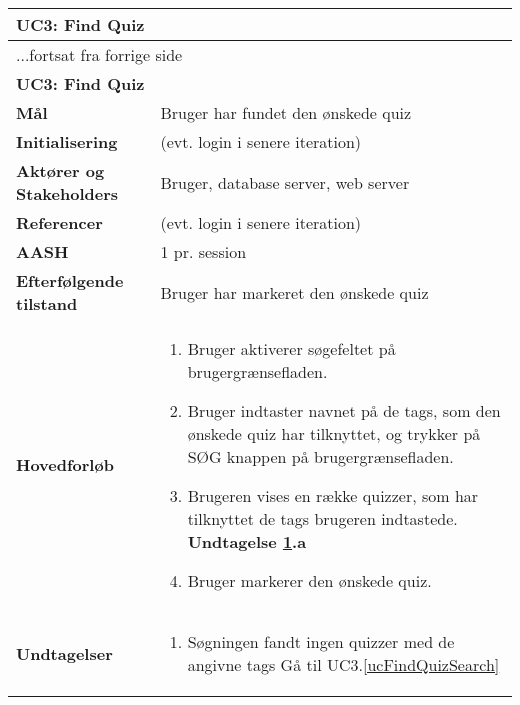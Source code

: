 \begin{center} \centering \label{ucFindQuiz}
	\begin{longtable}{|p{4.6cm}|p{9.4cm}|}  %
	\hline
		\multicolumn{2}{|l|}{\textbf{UC3: Find Quiz}} \\\hline
		\endfirsthead
		
		\multicolumn{2}{l}{...fortsat fra forrige side} \\ \hline %
		\multicolumn{2}{|l|}{\textbf{UC3: Find Quiz}} \\\hline
		\endhead	
		
		\textbf{Mål}					& Bruger har fundet den ønskede quiz
		\\\hline
		\textbf{Initialisering}			& (evt. login i senere iteration)
		\\\hline
		\textbf{Aktører og Stakeholders}	&Bruger, database server, web server
		\\\hline 
		\textbf{Referencer}				& (evt. login i senere iteration)
		\\\hline
		\textbf{AASH}					& 1 pr. session
		\\\hline
		\textbf{Efterfølgende tilstand}	& Bruger har markeret den ønskede quiz
		\\\hline
		\textbf{Hovedforløb}					
			&\begin{enumerate}
				\item Bruger aktiverer søgefeltet på brugergrænsefladen.
				\item \label{ucFindQuizSearch} Bruger indtaster navnet på de tags, %
				som den ønskede quiz har tilknyttet, og trykker på SØG knappen på brugergrænsefladen.
				\item \label{ucFindQuizNoResults} Brugeren vises en række quizzer, som har tilknyttet de tags brugeren indtastede.
				\textbf{Undtagelse \ref{ucFindQuizNoResults}.a}
				\item Bruger markerer den ønskede quiz.
				
			\end{enumerate}\\\hline
		\textbf{Undtagelser}
			&\begin{enumerate} [label=\ref{ucFindQuizNoResults}.a]
				\item Søgningen fandt ingen quizzer med de angivne tags %
				\subitem Gå til UC3.\ref{ucFindQuizSearch}
			\end{enumerate}
						
			\\\hline
	\end{longtable} 
\end{center}